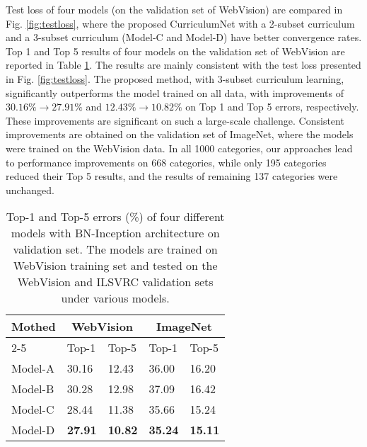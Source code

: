 \documentclass[runningheads]{llncs}
\begin{document}
\begin{figure*}[tb]
\centering
{}
\vspace{-5mm}
\caption{Testing loss of four different models with BN-Inception architecture, (left) Density-based curriculum, and (right) K-mean based curriculum.}
\label{fig:testloss}
\end{figure*}

Test loss of four models (on the validation set of WebVision) are compared in Fig. \ref{fig:testloss}, where the proposed CurriculumNet with a 2-subset curriculum and a 3-subset curriculum (Model-C and Model-D) have better convergence rates.
Top 1 and Top 5 results of four models on the validation set of WebVision are reported in Table \ref{tbl:test_model}. The results are mainly consistent with the test loss presented in Fig. \ref{fig:testloss}. The proposed method, with 3-subset curriculum learning, significantly outperforms the model trained on all data, with improvements of $30.16\% \rightarrow 27.91\%$ and $12.43\% \rightarrow 10.82\%$ on Top 1 and Top 5 errors, respectively. These improvements are significant on such a large-scale challenge. Consistent improvements are obtained on the validation set of ImageNet, where the models were trained on the WebVision data. In all 1000 categories, our approaches lead to performance improvements on 668 categories, while only 195 categories reduced their Top 5 results, and the results of remaining 137 categories were unchanged.










\begin{table}[tp]
\begin{center}
\caption{Top-1 and Top-5 errors (\%) of four different models with BN-Inception architecture on validation set. The models are trained on  WebVision training set and tested on the WebVision and ILSVRC validation sets under various models.}
\label{tbl:test_model}
\vspace{-2mm}
\begin{tabular}{p{1.8cm}|p{1.6cm}<{\centering}|p{1.6cm}<{\centering}|p{1.6cm}<{\centering}|p{1.6cm}<{\centering}}
  \hline
 \multirow{2}{*}{Mothed}& \multicolumn{2}{c}{\textbf{ WebVision}}&  \multicolumn{2}{c}{\textbf{ImageNet}} \\  \cline{2-5}
&Top-1&Top-5&Top-1&Top-5 \\
\hline
Model-A & 30.16 &  12.43 &36.00&16.20 \\
  \hline
  Model-B & 30.28& 12.98&37.09&16.42 \\
    \hline
  Model-C  & 28.44 & 11.38 &35.66&15.24 \\
  \hline
  Model-D  & {\bf27.91} &{\bf 10.82} &{\bf 35.24}& {\bf 15.11}  \\
  \hline
\end{tabular}


\end{center}
\end{table}
\end{document}
